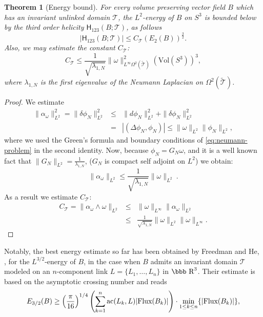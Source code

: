\documentclass[12pt]{article}
\numberwithin{equation}{section}
\newtheorem{theorem}{Theorem}[section]
\newcommand{\R}{\mbox{\bbb R}}       %
\begin{document}
\begin{theorem}[Energy bound]
 For every volume preserving vector field $B$ which has an invariant unlinked domain $\mathcal{T}$,
 the $L^2$-energy of $B$ on $S^3$ is bounded below by the third order helicity $\mathsf{H}_{123}(B;\mathcal{T})$, as follows
 \begin{equation}\label{eq:H123-estimate}
  |\mathsf{H}_{123}(B;\mathcal{T})|\leq C_\mathcal{T} (E_2(B))^\frac{3}{2}.
 \end{equation}
Also, we may estimate the constant $C_\mathcal{T}$:
 \begin{equation}\label{eq:C_T-estimate}
  C_\mathcal{T}\leq \frac{1}{\sqrt{\lambda_{1,N}}}\|\omega\|^2_{L^\infty\Omega^2(\widetilde{\mathcal{T}})}(\text{Vol}(S^3))^3,
 \end{equation}
where $\lambda_{1,N}$ is the first eigenvalue of the Neumann  Laplacian on  $\Omega^2(\widetilde{\mathcal{T}})$.
\end{theorem}
\begin{proof}
We estimate
\begin{eqnarray*}
 \|\alpha_\omega\|^2_{L^2} = \|\delta \phi_N\|^2_{L^2} & \leq & \|d\phi_N\|^2_{L^2}+\|\delta\phi_N\|^2_{L^2}\\
 & = & |(\Delta \phi_N,\phi_N)| \leq  \|\omega\|_{L^2}\|\phi_N\|_{L^2},
\end{eqnarray*}
where we used the Green's formula \cite[p. 60]{Schwarz95} and boundary conditions of \eqref{eq:neumann-problem} in the second identity. Now, because $\phi_N=G_N\omega$, and 
it is a well known fact that $\|G_N\|_{L^2}=\frac{1}{\lambda_{1,N}}$, ($G_N$ is compact self adjoint on $L^2$) we obtain:
\[
\|\alpha_\omega\|_{L^2}\leq \frac{1}{\sqrt{\lambda_{1, N}}} \|\omega\|_{L^2}\ .
\]
As a result we estimate $C_\mathcal{T}$:
\begin{eqnarray*}
 C_\mathcal{T}=\|\alpha_\omega\wedge\omega\|_{L^2} & \leq & \|\omega\|_{L^\infty}\|\alpha_\omega\|_{L^2}\\
 & \leq &  \frac{1}{\sqrt{\lambda_{1, N}}} \|\omega\|_{L^2}\|\omega\|_{L^\infty}.
\end{eqnarray*}
\end{proof}
Notably, the best energy estimate so far has been obtained by Freedman and He, \cite{Freedman91-2}, for the $L^{3/2}$-energy of $B$,  in the case when $B$ admits an invariant domain $\mathcal{T}$ modeled on an $n$-component link $L=\{L_1,\ldots,L_n\}$ in $\R^3$. Their estimate
is based on the asymptotic crossing number and reads
\begin{equation}\label{eq:energy-free-he}
 E_{3/2}(B)\geq \Bigl(\frac{\pi}{16}\Bigr)^{1/4}\left(\sum^n_{k=1} \text{ac}(L_k,L)|\text{Flux}(B_k)|\right)\cdot \min_{1\leq k\leq n}\{|\text{Flux}(B_k)|\},
\end{equation}
\end{document}
